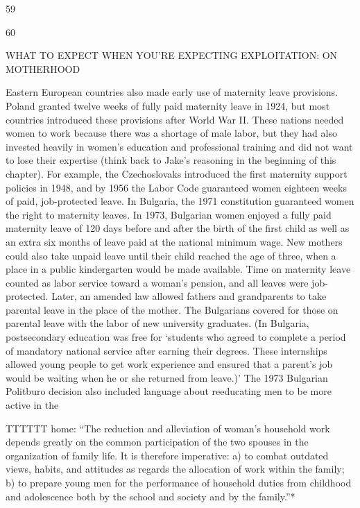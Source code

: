  \par 
59
 \par 
60
 \par 
WHAT TO EXPECT WHEN YOU'RE EXPECTING EXPLOITATION: ON MOTHERHOOD
 \par 
Eastern European countries also made early use of maternity leave provisions. Poland granted twelve weeks of fully paid maternity leave in 1924, but most countries introduced these provisions after World War II. These nations needed women to work because there was a shortage of male labor, but they had also invested heavily in women’s education and professional training and did not want to lose their expertise (think back to Jake’s reasoning in the beginning of this chapter). For example, the Czechoslovaks introduced the first maternity support policies in 1948, and by 1956 the Labor Code guaranteed women eighteen weeks of paid, job-protected leave. In Bulgaria, the 1971 constitution guaranteed women the right to maternity leaves. In 1973, Bulgarian women enjoyed a fully paid maternity leave of {\color{blue}120} days before and after the birth of the first child as well as an extra six months of leave paid at the national minimum wage. New mothers could also take unpaid leave until their child reached the age of three, when a place in a public kindergarten would be made available. Time on maternity leave counted as labor service toward a woman’s pension, and all leaves were job-protected. Later, an amended law allowed fathers and grandparents to take parental leave in the place of the mother. The Bulgarians covered for those on parental leave with the labor of new university graduates. (In Bulgaria, postsecondary education was free for ‘students who agreed to complete a period of mandatory national service after earning their degrees. These internships allowed young people to get work experience and ensured that a parent’s job would be waiting when he or she returned from leave.)’ The 1973 Bulgarian Politburo decision also included language about reeducating men to be more active in the
 \par 
TTTTTT home: “The reduction and alleviation of woman’s household work depends greatly on the common participation of the two spouses in the organization of family life. It is therefore imperative: a) to combat outdated views, habits, and attitudes as regards the allocation of work within the family; b) to prepare young men for the performance of household duties from childhood and adolescence both by the school and society and by the family.”*
 \par 
